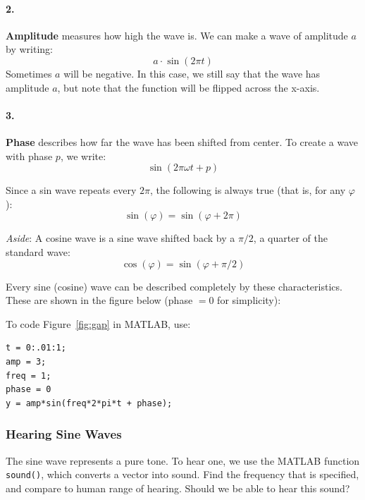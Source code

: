 \documentclass{article}
\begin{document}
\paragraph*{2.} {\bf Amplitude} measures how high the wave is.  We can make a wave of amplitude $a$ by writing:
\[a\cdot \sin(2\pi t)
\]
Sometimes $a$ will be negative.  In this case, we still say that the wave has amplitude $a$, but note that the function will be flipped across the x-axis.

\paragraph*{3.} {\bf Phase} describes how far the wave has been shifted from center.  To create a wave with phase $p$, we write:
\[\sin(2\pi \omega t + p)\]

Since a sin wave repeats every $2\pi$, the following is always true (that is, for any $\varphi$):
\[\sin(\varphi ) = \sin(\varphi +2\pi) \]

{\it Aside}: A cosine wave is a sine wave shifted back by a $\pi/2$, a quarter of the standard wave:
\[\cos(\varphi) = \sin(\varphi + \pi/2)\]


Every sine (cosine) wave can be described completely by these characteristics.  These are shown in the figure below (phase $=0$ for simplicity):





To code Figure~\ref{fig:gap} in MATLAB, use:

\begin{verbatim}
t = 0:.01:1;
amp = 3;
freq = 1;
phase = 0
y = amp*sin(freq*2*pi*t + phase);
\end{verbatim}

\subsubsection{Hearing Sine Waves}
The sine wave represents a pure tone.  To hear one, we use the MATLAB function {\tt sound()}, which converts a vector into sound.  Find the frequency that is specified, and compare to human range of hearing.  Should we be able to hear this sound?
\end{document}
